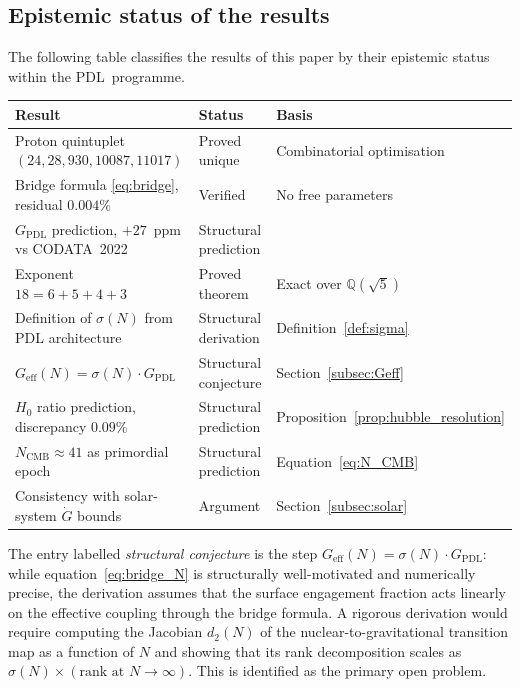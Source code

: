 \documentclass[11pt,a4paper]{article}
\theoremstyle{definition}
\newcommand{\PDL}{\textnormal{PDL}}
\newcommand{\Geff}{G_{\mathrm{eff}}}
\newcommand{\GPDL}{G_{\mathrm{PDL}}}
\newcommand{\Hzero}{H_0}
\newcommand{\sig}{\sigma}
\newcommand{\dmap}[1]{d_{#1}}
\begin{document}
\subsection{Epistemic status of the results}
\label{subsec:epistemic}

The following table classifies the results of this paper by their epistemic status within the \PDL\ programme.

\begin{center}
\begin{tabular}{lll}
\toprule
Result & Status & Basis \\
\midrule
Proton quintuplet $(24, 28, 930, 10087, 11017)$ & Proved unique & Combinatorial optimisation \cite{Combinatorial_Proton_v2_2026} \\
Bridge formula \eqref{eq:bridge}, residual $0.004\%$ & Verified & No free parameters \cite{Bridge_Formula_PDL_2026} \\
$\GPDL$ prediction, $+27$~ppm vs CODATA~2022 & Structural prediction & \cite{Bridge_Formula_PDL_2026} \\
Exponent $18 = 6+5+4+3$ & Proved theorem & Exact over $\mathbb{Q}(\sqrt{5})$ \cite{Topology_18_PDL_2026} \\
Definition of $\sig(N)$ from PDL architecture & Structural derivation & Definition~\ref{def:sigma} \\
$\Geff(N) = \sig(N)\cdot\GPDL$ & Structural conjecture & Section~\ref{subsec:Geff} \\
$\Hzero$ ratio prediction, discrepancy $0.09\%$ & Structural prediction & Proposition~\ref{prop:hubble_resolution} \\
$N_{\mathrm{CMB}} \approx 41$ as primordial epoch & Structural prediction & Equation~\eqref{eq:N_CMB} \\
Consistency with solar-system $\dot{G}$ bounds & Argument & Section~\ref{subsec:solar} \\
\bottomrule
\end{tabular}
\end{center}

The entry labelled \emph{structural conjecture} is the step $\Geff(N) = \sig(N)\cdot\GPDL$: while equation~\eqref{eq:bridge_N} is structurally well-motivated and numerically precise, the derivation assumes that the surface engagement fraction acts linearly on the effective coupling through the bridge formula. A rigorous derivation would require computing the Jacobian $\dmap{2}(N)$ of the nuclear-to-gravitational transition map as a function of $N$ and showing that its rank decomposition scales as $\sig(N) \times (\text{rank at }N\to\infty)$. This is identified as the primary open problem.
\end{document}
